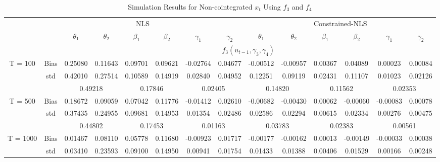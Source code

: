 \documentclass[a4paper,12pt,times,numbered,print,index]{report}
\numberwithin{equation}{section}
\begin{document}
\begin{table}[htbp]
	\centering
	\caption{Simulation Results for Non-cointegrated $x_t$ Using $f_3$ and $f_4$}
	\begin{adjustbox}{max width=\textwidth}
	\begin{tabular}{cccccccccccccc}
		\toprule
		& \multicolumn{7}{c}{NLS}                               & \multicolumn{6}{c}{Constrained-NLS} \\
		&       & $\theta_1$ & $\theta_2$ & $\beta_1$ & $\beta_2$ & $\gamma_1$ & $\gamma_{2}$ & $\theta_1$ & $\theta_2$ & $\beta_1$ & $\beta_2$ & $\gamma_1$ & $\gamma_{2}$ \\
		\midrule
		&       & \multicolumn{12}{c}{$f_3 (u_{t-1}, \gamma_3, \gamma_4)$} \\
		\midrule
		\multirow{3}[1]{*}{T = 100} & Bias  & \textcolor[rgb]{ 0,  .439,  .753}{0.25080} & 0.11643 & 0.09701 & 0.09621 & -0.02764 & 0.04677 & \textcolor[rgb]{ 0,  .439,  .753}{-0.00512} & -0.00957 & 0.00367 & 0.04089 & 0.00023 & 0.00084 \\
		& std   & 0.42010 & 0.27514 & 0.10589 & 0.14919 & 0.02840 & 0.04952 & 0.12251 & 0.09119 & 0.02431 & 0.11107 & 0.01023 & 0.02126 \\
		&       & \multicolumn{2}{c}{0.49218} & \multicolumn{2}{c}{0.17846} & \multicolumn{2}{c}{0.02405} & \multicolumn{2}{c}{0.14820} & \multicolumn{2}{c}{0.11562} & \multicolumn{2}{c}{0.02353} \\
		\multirow{3}[0]{*}{T = 500} & Bias  & \textcolor[rgb]{ 0,  .439,  .753}{0.18672} & 0.09059 & 0.07042 & 0.11776 & -0.01412 & 0.02610 & \textcolor[rgb]{ 0,  .439,  .753}{-0.00682} & -0.00430 & 0.00062 & -0.00060 & -0.00083 & 0.00078 \\
		& std   & 0.37435 & 0.24955 & 0.09681 & 0.14953 & 0.01354 & 0.02486 & 0.02586 & 0.02294 & 0.00615 & 0.02334 & 0.00276 & 0.00475 \\
		&       & \multicolumn{2}{c}{0.44802} & \multicolumn{2}{c}{0.17453} & \multicolumn{2}{c}{0.01163} & \multicolumn{2}{c}{0.03783} & \multicolumn{2}{c}{0.02383} & \multicolumn{2}{c}{0.00561} \\
		\multirow{3}[1]{*}{T = 1000} & Bias  & \textcolor[rgb]{ 0,  .439,  .753}{0.01467} & 0.08110 & 0.05778 & 0.11680 & -0.00923 & 0.01717 & \textcolor[rgb]{ 0,  .439,  .753}{-0.00177} & -0.00162 & 0.00013 & -0.00149 & -0.00033 & 0.00038 \\
		& std   & 0.03410 & 0.23593 & 0.09100 & 0.14950 & 0.00941 & 0.01754 & 0.01433 & 0.01388 & 0.00406 & 0.01529 & 0.00166 & 0.00248 \\

\end{tabular}
\end{adjustbox}
\end{table}
\end{document}
